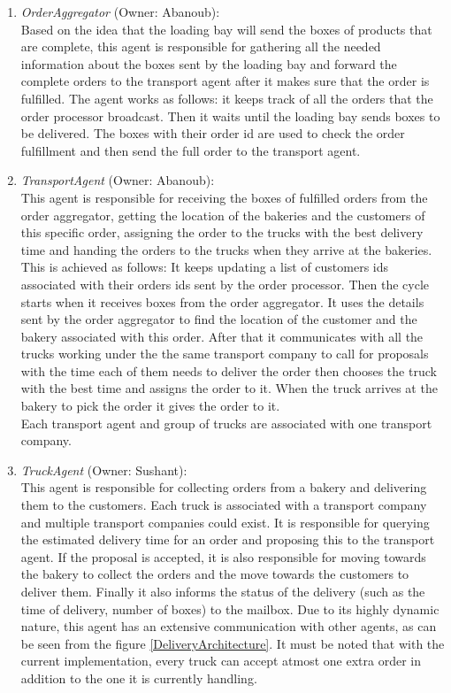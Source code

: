 \documentclass[11pt, a4paper]{article}
\begin{document}
\begin{enumerate}
	\item \textit{OrderAggregator} (Owner: Abanoub):\\
	 Based on the idea that the loading bay will send the boxes of products that are complete, this agent is responsible for gathering all the needed information about the boxes sent by the loading bay and forward the complete orders to the transport agent after it makes sure that the order is fulfilled. The agent works as follows: it keeps track of all the orders that the order processor broadcast. Then it waits until the loading bay sends boxes to be delivered. The boxes with their order id are used to check the order fulfillment and then send the full order to the transport agent.
	\item \textit{TransportAgent} (Owner: Abanoub):\\
	This agent is responsible for receiving the boxes of fulfilled orders from the order aggregator, getting the location of the bakeries and the customers of this specific order, assigning the order to the trucks with the best delivery time and handing the orders to the trucks when they arrive at the bakeries. This is achieved as follows: It keeps updating a list of customers ids associated with their orders ids sent by the order processor. Then the cycle starts when it receives boxes from the order aggregator. It uses the details sent by the order aggregator to find the location of the customer and the bakery associated with this order. After that it communicates with all the trucks working under the the same transport company to call for proposals with the time each of them needs to deliver the order then chooses the truck with the best time and assigns the order to it. When the truck arrives at the bakery to pick the order it gives the order to it.\\
	Each transport agent and group of trucks are associated with one transport company.
	\item \textit{TruckAgent} (Owner: Sushant):\\
	This agent is responsible for collecting orders from a bakery and delivering them to the customers. Each truck is associated with a transport company and multiple transport companies could exist. It is responsible for querying the estimated delivery time for an order and proposing this to the transport agent. If the proposal is accepted, it is also responsible for moving towards the bakery to collect the orders and the move towards the customers to deliver them. Finally it also informs the status of the delivery (such as the time of delivery, number of boxes) to the mailbox. Due to its highly dynamic nature, this agent has an extensive communication with other agents, as can be seen from the figure \ref{DeliveryArchitecture}. It must be noted that with the current implementation, every truck can accept atmost one extra order in addition to the one it is currently handling. 
	

\end{enumerate}
\end{document}
